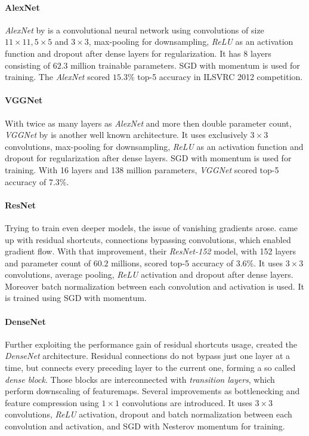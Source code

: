 \paragraph{AlexNet}
\emph{AlexNet} by \cite{alexnet} is a convolutional neural network using convolutions of size $11 \times 11, 5 \times 5$ and $3 \times 3$, max-pooling for downsampling, \emph{ReLU} as an activation function and dropout after dense layers for regularization. It has 8 layers consisting of $62.3$ million trainable parameters. SGD with momentum is used for training. The \emph{AlexNet} scored $15.3\%$ top-5 accuracy in ILSVRC 2012 competition.

\paragraph{VGGNet}
With twice as many layers as \emph{AlexNet} and more then double parameter count, \emph{VGGNet} by \cite{DBLP:journals/corr/SimonyanZ14a} is another well known architecture. It uses exclusively $3 \times 3$ convolutions, max-pooling for downsampling, \emph{ReLU} as an activation function and dropout for regularization after dense layers. SGD with momentum is used for training. With 16 layers and 138 million parameters, \emph{VGGNet} scored top-5 accuracy of $7.3\%$.

\paragraph{ResNet}
Trying to train even deeper models, the issue of vanishing gradients arose. \cite{DBLP:journals/corr/HeZRS15} came up with residual shortcuts, connections bypassing convolutions, which enabled gradient flow. With that improvement, their \emph{ResNet-152} model, with 152 layers and parameter count of $60.2$ millions, scored top-5 accuracy of $3.6\%$. It uses $3 \times 3$ convolutions, average pooling, \emph{ReLU} activation and dropout after dense layers. Moreover batch normalization between each convolution and activation is used. It is trained using SGD with momentum.

\paragraph{DenseNet}
\label{sec:densenet}
Further exploiting the performance gain of residual shortcuts usage, \cite{DBLP:journals/corr/HuangLW16a} created the \emph{DenseNet} architecture. Residual connections do not bypass just one layer at a time, but connects every preceding layer to the current one, forming a so called \emph{dense block}. Those blocks are interconnected with \emph{transition layers}, which perform downscaling of featuremaps. Several improvements as bottlenecking and feature compression using $1 \times 1$ convolutions are introduced. It uses $3 \times 3$ convolutions, \emph{ReLU} activation, dropout and batch normalization between each convolution and activation, and SGD with Nesterov momentum for training.

